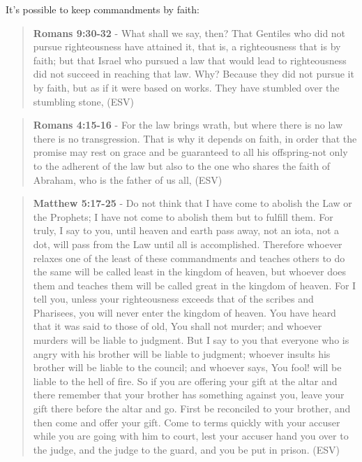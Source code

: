 \documentclass[11pt]{article}
\begin{document}
It's possible to keep commandments by faith:

\begin{quote}
\textbf{Romans 9:30-32} - What shall we say, then? That Gentiles who did not pursue righteousness have attained it, that is, a righteousness that is by faith; but that Israel who pursued a law that would lead to righteousness did not succeed in reaching that law. Why? Because they did not pursue it by faith, but as if it were based on works. They have stumbled over the stumbling stone, (ESV)
\end{quote}

\begin{quote}
\textbf{Romans 4:15-16} - For the law brings wrath, but where there is no law there is no transgression. That is why it depends on faith, in order that the promise may rest on grace and be guaranteed to all his offspring-not only to the adherent of the law but also to the one who shares the faith of Abraham, who is the father of us all, (ESV)
\end{quote}

\begin{quote}
\textbf{Matthew 5:17-25} - Do not think that I have come to abolish the Law or the Prophets; I have not come to abolish them but to fulfill them. For truly, I say to you, until heaven and earth pass away, not an iota, not a dot, will pass from the Law until all is accomplished. Therefore whoever relaxes one of the least of these commandments and teaches others to do the same will be called least in the kingdom of heaven, but whoever does them and teaches them will be called great in the kingdom of heaven. For I tell you, unless your righteousness exceeds that of the scribes and Pharisees, you will never enter the kingdom of heaven. You have heard that it was said to those of old, You shall not murder; and whoever murders will be liable to judgment. But I say to you that everyone who is angry with his brother will be liable to judgment; whoever insults his brother will be liable to the council; and whoever says, You fool! will be liable to the hell of fire. So if you are offering your gift at the altar and there remember that your brother has something against you, leave your gift there before the altar and go. First be reconciled to your brother, and then come and offer your gift. Come to terms quickly with your accuser while you are going with him to court, lest your accuser hand you over to the judge, and the judge to the guard, and you be put in prison. (ESV)
\end{quote}
\end{document}
